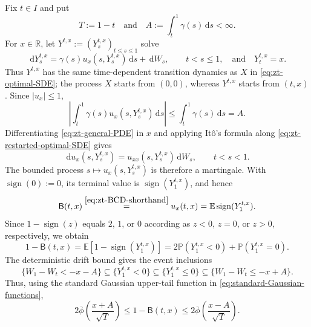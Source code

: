 \documentclass[10pt]{amsart}
\theoremstyle{definition}
\theoremstyle{remark}
\numberwithin{equation}{section}
\newcommand{\R}{\mathbb R}
\newcommand{\E}{\mathbb E}
\newcommand{\PP}{\mathbb P}
\newcommand{\1}{\mathbf 1}
\newcommand{\dd}{\,\mathrm d}
\newcommand{\stackref}[2]{\stackrel{#2}{#1}}
\begin{document}
Fix $t\in I$ and put
\begin{equation*}
 T:=1-t\quad\text{and}\quad A:=\int_t^1\gamma(s)\dd s<\infty.
\end{equation*}
For $x\in\R$, let $Y^{t,x}:=(Y_s^{t,x})_{t\leq s\leq1}$ solve
\begin{equation}
 \dd Y_s^{t,x}=\gamma(s)u_x(s,Y_s^{t,x})\dd s+\dd W_s,
 \qquad t<s\leq1,
 \quad\text{and}\quad Y_t^{t,x}=x.
 \label{eq:zt-restarted-optimal-SDE}
\end{equation}
Thus $Y^{t,x}$ has the same time-dependent transition dynamics as $X$ in \eqref{eq:zt-optimal-SDE}; the process $X$ starts from $(0,0)$, whereas $Y^{t,x}$ starts from $(t,x)$. Since $|u_x|\leq1$,
\begin{equation*}
 \left|\int_t^1\gamma(s)u_x(s,Y_s^{t,x})\dd s\right|
 \leq\int_t^1\gamma(s)\dd s=A.
\end{equation*}
Differentiating \eqref{eq:zt-general-PDE} in $x$ and applying It\^o's formula along \eqref{eq:zt-restarted-optimal-SDE} gives
\begin{equation*}
 \dd u_x(s,Y_s^{t,x})=u_{xx}(s,Y_s^{t,x})\dd W_s,
 \qquad t<s<1.
\end{equation*}
The bounded process $s\mapsto u_x(s,Y_s^{t,x})$ is therefore a martingale. With $\operatorname{sign}(0):=0$, its terminal value is $\operatorname{sign}(Y_1^{t,x})$, and hence
\begin{equation*}
 \mathsf B(t,x)
 \stackref{=}{\eqref{eq:zt-BCD-shorthand}}
 u_x(t,x)=\E\operatorname{sign}(Y_1^{t,x}).
\end{equation*}
Since $1-\operatorname{sign}(z)$ equals $2$, $1$, or $0$ according as $z<0$, $z=0$, or $z>0$, respectively, we obtain
\begin{equation*}
 1-\mathsf B(t,x)
 =\E[1-\operatorname{sign}(Y_1^{t,x})]
 =2\PP(Y_1^{t,x}<0)+\PP(Y_1^{t,x}=0).
\end{equation*}
The deterministic drift bound gives the event inclusions
\begin{equation*}
 \{W_1-W_t<-x-A\}\subseteq\{Y_1^{t,x}<0\}
 \subseteq\{Y_1^{t,x}\leq0\}
 \subseteq\{W_1-W_t\leq-x+A\}.
\end{equation*}
Thus, using the standard Gaussian upper-tail function in \eqref{eq:standard-Gaussian-functions},
\begin{equation}
 2\overline\phi\left(\frac{x+A}{\sqrt T}\right)
 \leq1-\mathsf B(t,x)\leq
 2\overline\phi\left(\frac{x-A}{\sqrt T}\right).
 \label{eq:zt-B-Gaussian-bracket}
\end{equation}
\end{document}
